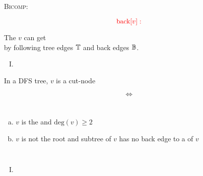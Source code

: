 \begin{frame}{}
  \centerline{\Large \textsc{Bicomp}: }

  \begin{center}
    
  \end{center}
\end{frame}

\begin{frame}{}

  \pause
  \[
    \textcolor{red}{\text{back}[v]:}
  \]

  \begin{center}
    The  $v$ can get \\[6pt]
    by following tree edges $\mathbb{T}$ and back edges $\mathbb{B}$. \\[15pt]

    \pause
    \begin{enumerate}[(I)]
      \centering
      \item {}
    \end{enumerate}
  \end{center}
\end{frame}

\begin{frame}{}
\end{frame}

\begin{frame}{}
  \begin{theorem}
    \centerline{In a DFS tree, $v$ is a cut-node}

    \[
      \iff
    \]

    \begin{columns}
	\begin{enumerate}[(a)]
	  \item $v$ is the  and $\text{deg}(v) \ge 2$
	  \item $v$ is not the root and  subtree of $v$ has no back edge to a  of $v$
	\end{enumerate}
    \end{columns}
  \end{theorem}

  \pause
  \vspace{0.80cm}
  \begin{enumerate}[(I)]
    \centering
    \setcounter{enumi}{1}
    \item {}
  \end{enumerate}
\end{frame}

